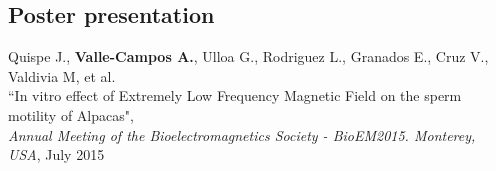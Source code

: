 \documentclass[margin,line]{res}
\newenvironment{list2}{
  \begin{list}{$\bullet$}{%
      \setlength{\itemsep}{0in}
      \setlength{\parsep}{0in} \setlength{\parskip}{0in}
      \setlength{\topsep}{0in} \setlength{\partopsep}{0in}
      \setlength{\leftmargin}{0.2in}}}{\end{list}}
\begin{document}
\begin{resume}



\section{\sc Poster presentation}

Quispe J., \textbf{Valle-Campos A.}, Ulloa G., Rodriguez L., Granados E., Cruz V., Valdivia M, et al.\\ ``In vitro effect of Extremely Low Frequency Magnetic Field on the sperm motility of Alpacas", \\ {\em Annual Meeting of the Bioelectromagnetics Society - BioEM2015. Monterey, USA}, July 2015\\%




\end{resume}
\end{document}
